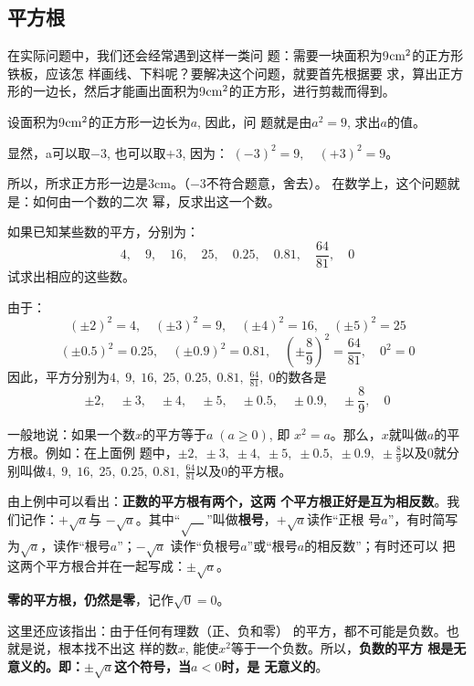 \subsection{平方根}
在实际问题中，我们还会经常遇到这样一类问
题：需要一块面积为9${\rm cm}^2$的正方形铁板，应该怎
样画线、下料呢？要解决这个问题，就要首先根据要
求，算出正方形的一边长，然后才能画出面积为9${\rm cm}^2$的正方形，进行剪裁而得到。

设面积为9${\rm cm}^2$的正方形一边长为$a$, 因此，问
题就是由$a^2=9$, 求出$a$的值。

显然，a可以取$-3$, 也可以取$+3$, 因为：
$(-3)^2=9,\quad (+3)^2=9$。

所以，所求正方形一边是3cm。（$-3$不符合题意，舍去）。
在数学上，这个问题就是：如何由一个数的二次
幂，反求出这一个数。

\begin{example}
    如果已知某些数的平方，分别为：
$$4,\quad 9,\quad 16,\quad 25,\quad 0.25,\quad 0.81,\quad \frac{64}{81},\quad 0$$
试求出相应的这些数。
\end{example}

\begin{solution}
由于：   
\[(\pm 2)^2=4,\quad  (\pm 3)^2=9,\quad (\pm 4)^2=16,\quad (\pm 5)^2=25\]
\[(\pm 0.5)^2=0.25,\quad (\pm 0.9)^2=0.81,\quad \left(\pm \frac{8}{9}\right)^2=\frac{64}{81},\quad 0^2=0 \]
因此，平方分别为$4,\; 9,\; 16,\; 25,\; 0.25,\; 0.81,\; \frac{64}{81},\; 0$的数各是
$$\pm 2,\quad \pm 3,\quad\pm 4,\quad\pm 5,\quad\pm 0.5,\quad\pm 0.9,\quad
\pm \frac{8}{9},\quad 0$$
\end{solution}

一般地说：如果一个数$x$的平方等于$a\; (a\ge 0)$, 即
$x^2=a$。那么，$x$就叫做$a$的平方根。例如：在上面例
题中，$\pm 2,\; \pm 3,\;\pm 4,\;\pm 5,\;\pm 0.5,\;\pm 0.9,\;
\pm \frac{8}{9}$以及0就分别叫做$4,\; 9,\; 16,\; 25,\; 0.25,\; 0.81,\; \frac{64}{81}$以及0的平方根。

由上例中可以看出：\textbf{正数的平方根有两个，这两
个平方根正好是互为相反数}。我们记作：$+\sqrt{a}$与
$-\sqrt{a}$。其中“$\sqrt{\quad}$”叫做\textbf{根号}，$+\sqrt{a}$读作“正根
号$a$”，有时简写为$\sqrt{a}$，读作“根号$a$”；$-\sqrt{a}$
读作“负根号$a$”或“根号$a$的相反数”；有时还可以
把这两个平方根合并在一起写成：$\pm \sqrt{a}$。

\textbf{零的平方根，仍然是零}，记作$\sqrt{0}=0$。

这里还应该指出：由于任何有理数（正、负和零）
的平方，都不可能是负数。也就是说，根本找不出这
样的数$x$, 能使$x^2$等于一个负数。所以，\textbf{负数的平方
根是无意义的。即：$\pm \sqrt{a}$这个符号，当$a<0$时，是
无意义的}。

